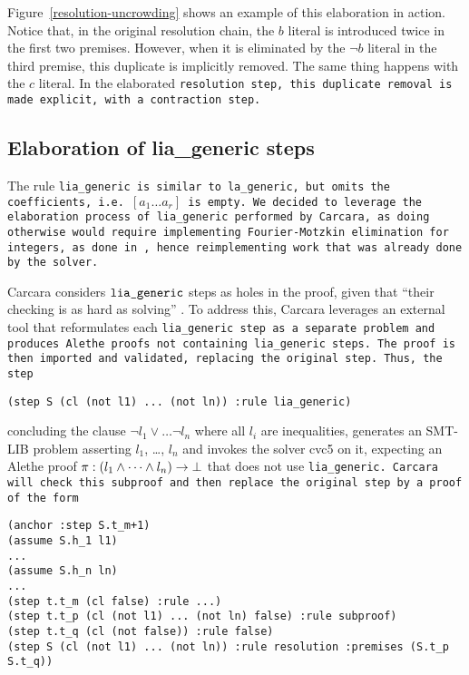 Figure~\ref{resolution-uncrowding} shows an example of this elaboration in action.
Notice that, in the original resolution chain, the $b$ literal is introduced twice in the first two premises.
However, when it is eliminated by the $\neg b$ literal in the third premise, this duplicate is implicitly removed.
The same thing happens with the $c$ literal. In the elaborated \tt{resolution} step, this duplicate removal is made explicit, with a \tt{contraction} step.



\subsection{Elaboration of lia\_generic steps}
\label{ssec:elaboration-lia}

The rule \tt{lia\_generic} is similar to \tt{la\_generic}, but omits the coefficients,
i.e.\ \colorbox{rxpink!30}{$[a_1 \dots a_r]$} is empty.
We decided to leverage the elaboration process of \tt{lia\_generic} performed by Carcara, as doing otherwise would require implementing Fourier-Motzkin elimination for integers, as done in \cite{micromega,omegatest}, hence reimplementing work that was already done by the solver.

Carcara considers $\tt{lia\_generic}$ steps as holes in the proof, given that ``their checking is as hard as solving'' \cite[\S 3.2]{carcara}.
To address this, Carcara leverages an external tool that reformulates each \tt{lia\_generic} step as a separate problem and produces Alethe proofs not containing \tt{lia\_generic} steps.
The proof is then imported and validated, replacing the original step.
Thus, the step
%
\begin{lstlisting}[language=SMT, frame=none, numbers=none]
    (step S (cl (not l1) ... (not ln)) :rule lia_generic)
\end{lstlisting}
%
concluding the clause $\neg l_1 \lor \dots \neg l_n$ where all $l_i$ are inequalities, generates an SMT-LIB problem asserting $l_1$, \dots, $l_n$ and invokes the solver cvc5 on it, expecting an Alethe proof $\pi : (l_1 \land \dots \land l_n) \ra \bot$
that does not use \tt{lia\_generic}. Carcara will check this subproof and then replace the original step by a proof of the form

\begin{lstlisting}[language=SMT,caption={Elaboration of \tt{lia\_generic}},label={lst:elab_lia}]
(anchor :step S.t_m+1)
(assume S.h_1 l1)
...
(assume S.h_n ln)
...
(step t.t_m (cl false) :rule ...)
(step t.t_p (cl (not l1) ... (not ln) false) :rule subproof)
(step t.t_q (cl (not false)) :rule false)
(step S (cl (not l1) ... (not ln)) :rule resolution :premises (S.t_p S.t_q))
\end{lstlisting}

